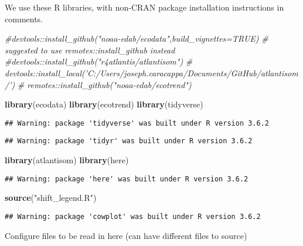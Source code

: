 \documentclass[
]{article}
\newenvironment{Shaded}{\begin{snugshade}}{\end{snugshade}}
\newcommand{\CommentTok}[1]{\textcolor[rgb]{0.56,0.35,0.01}{\textit{#1}}}
\newcommand{\KeywordTok}[1]{\textcolor[rgb]{0.13,0.29,0.53}{\textbf{#1}}}
\newcommand{\NormalTok}[1]{#1}
\newcommand{\StringTok}[1]{\textcolor[rgb]{0.31,0.60,0.02}{#1}}
\begin{document}
We use these R libraries, with non-CRAN package installation
instructions in comments.

\begin{Shaded}
\begin{Highlighting}[]
\CommentTok{#devtools::install_github("noaa-edab/ecodata",build_vignettes=TRUE) }
\CommentTok{# suggested to use remotes::install_github instead}
\CommentTok{#devtools::install_github("r4atlantis/atlantisom")}
\CommentTok{# devtools::install_local('C:/Users/joseph.caracappa/Documents/GitHub/atlantisom/')}
\CommentTok{# remotes::install_github("noaa-edab/ecotrend")}

\KeywordTok{library}\NormalTok{(ecodata)}
\KeywordTok{library}\NormalTok{(ecotrend)}
\KeywordTok{library}\NormalTok{(tidyverse)}
\end{Highlighting}
\end{Shaded}

\begin{verbatim}
## Warning: package 'tidyverse' was built under R version 3.6.2
\end{verbatim}

\begin{verbatim}
## Warning: package 'tidyr' was built under R version 3.6.2
\end{verbatim}

\begin{Shaded}
\begin{Highlighting}[]
\KeywordTok{library}\NormalTok{(atlantisom)}
\KeywordTok{library}\NormalTok{(here)}
\end{Highlighting}
\end{Shaded}

\begin{verbatim}
## Warning: package 'here' was built under R version 3.6.2
\end{verbatim}

\begin{Shaded}
\begin{Highlighting}[]
\KeywordTok{source}\NormalTok{(}\StringTok{"shift_legend.R"}\NormalTok{)}
\end{Highlighting}
\end{Shaded}

\begin{verbatim}
## Warning: package 'cowplot' was built under R version 3.6.2
\end{verbatim}

Configure files to be read in here (can have different files to source)
\end{document}
